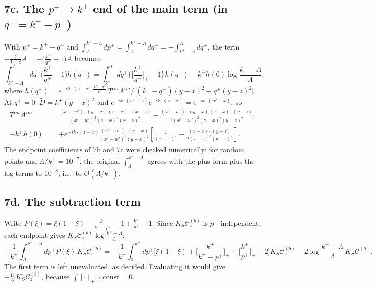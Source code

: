 \documentclass[10pt]{article}
\numberwithin{equation}{section}
\newcommand{\Cz}{\mathcal{C}^{(b)}_{z}}
\begin{document}
\subsection*{7c. The $p^{+}\to k^{+}$ end of the main term (in $q^{+}=k^{+}-p^{+}$)}
With $p^{+}=k^{+}-q^{+}$ and $\int_{\Lambda}^{k^{+}-\Lambda}dp^{+}=\int_{\Lambda}^{k^{+}-\Lambda}dq^{+}=-\int_{k^{+}-\Lambda}^{\Lambda}dq^{+}$, the term $-\frac{\xi}{1-\xi}A=-\big(\frac{k^{+}}{q^{+}}-1\big)A$ becomes
\begin{equation}
\int_{k^{+}-\Lambda}^{\Lambda}dq^{+}\Big(\frac{k^{+}}{q^{+}}-1\Big)h(q^{+})=\int_{k^{+}}^{0}dq^{+}\Big\{\Big[\frac{k^{+}}{q^{+}}\Big]_{+}-1\Big\}h(q^{+})-k^{+}h(0)\log\frac{k^{+}-\Lambda}{\Lambda},
\end{equation}
where $h(q^{+})=e^{-ik\cdot(z-x)\frac{k^{+}-q^{+}}{k^{+}}}\,T^{im}A^{im}\big/\big[(k^{+}-q^{+})(y-x)^{2}+q^{+}(y-z)^{2}\big]$. At $q^{+}=0$: $\widetilde D=k^{+}(y-x)^{2}$ and $e^{-ik\cdot(w'-z)}e^{-ik\cdot(z-x)}=e^{-ik\cdot(w'-x)}$, so
\begin{align}
T^{im}A^{im}&=\frac{(x'-w')\cdot(y-x)\,(z-x)\cdot(x-z)}{(x'-w')^{2}(z-x)^{2}(x-z)^{2}}-\frac{(x'-w')\cdot(y-x)\,(z-x)\cdot(y-z)}{2(x'-w')^{2}(z-x)^{2}(y-z)^{2}},\\
-k^{+}h(0)&=+e^{-ik\cdot(z-x)}\frac{(x'-w')\cdot(y-x)}{(x'-w')^{2}(y-x)^{2}}\left[\frac{1}{(x-z)^{2}}-\frac{(x-z)\cdot(y-z)}{2(x-z)^{2}(y-z)^{2}}\right].
\end{align}
The endpoint coefficients of 7b and 7c were checked numerically: for random points and $\Lambda/k^{+}=10^{-7}$, the original $\int_{\Lambda}^{k^{+}-\Lambda}$ agrees with the plus form plus the log terms to $10^{-8}$, i.e.\ to $O(\Lambda/k^{+})$.

\subsection*{7d. The subtraction term}
Write $P(\xi)=\xi(1-\xi)+\frac{k^{+}}{k^{+}-p^{+}}-1+\frac{k^{+}}{p^{+}}-1$. Since $K_{S}\Cz$ is $p^{+}$ independent, each endpoint gives $K_{S}\Cz\log\frac{k^{+}-\Lambda}{\Lambda}$:
\begin{equation}
-\frac{1}{k^{+}}\int_{\Lambda}^{k^{+}-\Lambda}dp^{+}P(\xi)\,K_{S}\Cz=-\frac{1}{k^{+}}\int_{0}^{k^{+}}dp^{+}\Big[\xi(1-\xi)+\Big[\frac{k^{+}}{k^{+}-p^{+}}\Big]_{+}+\Big[\frac{k^{+}}{p^{+}}\Big]_{+}-2\Big]K_{S}\Cz-2\log\frac{k^{+}-\Lambda}{\Lambda}\,K_{S}\Cz .
\end{equation}
The first term is left unevaluated, as decided. Evaluating it would give $+\frac{11}{6}K_{S}\Cz$, because $\int[\cdot]_{+}\times\text{const}=0$.
\end{document}

